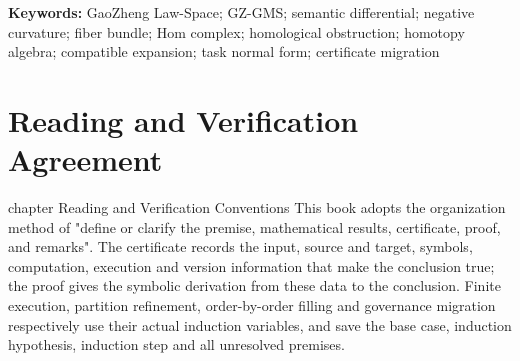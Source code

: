 \documentclass[12pt,a4paper,openany,notitlepage]{report}
\theoremstyle{plain}
\theoremstyle{definition}
\theoremstyle{remark}
\begin{document}
\begin{CJK*}
\begin{abstract}
In a complete parameterized family, hyperbolic geometric inputs, nonzero homology classes, actual unit actions, and full higher-order operations share one registered state. Geometric parameters determine the binary operation, while actual progress determines the ternary filling. An explicit linear map relates the linear residual to the total square of the coderivation, and both vanish along the same finite path. The construction also establishes unreachability under the original action family, reachability under the new family, the minimum number of additional directions, and lower bounds on the number of unit actions. Finally, task normal forms and finite-state refinements provide exact readback, equivalence of future observations, and strategy reuse. Migration of law objects uses target inclusion, commutation on states and chains, transport of atomic truth values, version freezing, and unions of premises to prove that arbitrary finite governance updates and their actual execution preserve the corresponding task conclusions.\end{abstract}


\noindent \textbf { Keywords: } GaoZheng Law-Space; GZ-GMS; semantic differential; negative curvature; fiber bundle; Hom complex; homological obstruction; homotopy algebra; compatible expansion; task normal form; certificate migration \par \endgroup \clearpage \tableofcontents \clearpage \chapter* { Reading and Verification Agreement }  {chapter} { Reading and Verification Conventions } This book adopts the organization method of "define or clarify the premise, mathematical results, certificate, proof, and remarks". The certificate records the input, source and target, symbols, computation, execution and version information that make the conclusion true; the proof gives the symbolic derivation from these data to the conclusion. Finite execution, partition refinement, order-by-order filling and governance migration respectively use their actual induction variables, and save the base case, induction hypothesis, induction step and all unresolved premises.


\end{CJK*}
\end{document}
